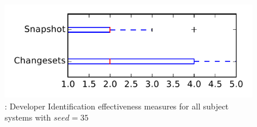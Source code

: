 
\begin{figure}
\centering
\includegraphics[height=0.4\textheight]{figures/dit_seed/rq1_tiny_35}
\caption{\rtwo: Developer Identification effectiveness measures for all subject systems with $seed=35$}
\label{fig:dit_seed:rq1:tiny}
\end{figure}
